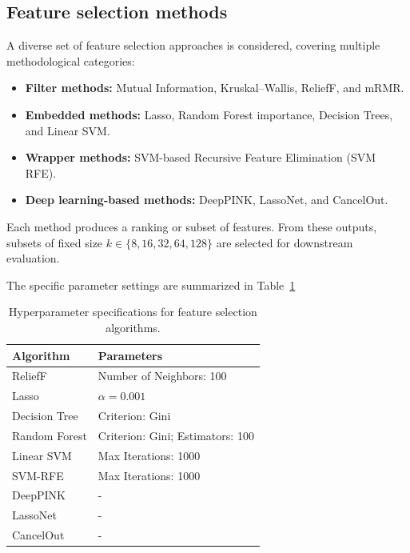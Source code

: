 \subsection{Feature selection methods}

A diverse set of feature selection approaches is considered, covering multiple methodological categories:
\begin{itemize}
    \item \textbf{Filter methods:} Mutual Information, Kruskal–Wallis, ReliefF, and mRMR.
    \item \textbf{Embedded methods:} Lasso, Random Forest importance, Decision Trees, and Linear SVM.
    \item \textbf{Wrapper methods:} SVM-based Recursive Feature Elimination (SVM RFE).
    \item \textbf{Deep learning-based methods:} DeepPINK, LassoNet, and CancelOut.
\end{itemize}
Each method produces a ranking or subset of features. From these outputs, subsets of fixed size $k \in \{8, 16, 32, 64, 128\}$ are selected for downstream evaluation.

The specific parameter settings are summarized in Table~\ref{tab:params-methods}

\begin{table}[h!]
\centering
\label{tab:params}
\begin{tabular}{ll}
\hline
\textbf{Algorithm} & \textbf{Parameters} \\ \hline

ReliefF & Number of Neighbors: 100 \\ \hline

Lasso & $\alpha = 0.001$ \\
Decision Tree & Criterion: Gini \\
Random Forest & Criterion: Gini; Estimators: 100 \\
Linear SVM & Max Iterations: 1000 \\ \hline

SVM-RFE & Max Iterations: 1000 \\ \hline

DeepPINK & - \\
LassoNet & - \\
CancelOut & - \\ \hline

\end{tabular}
\caption{Hyperparameter specifications for feature selection algorithms.}
\label{tab:params-methods}
\end{table}

